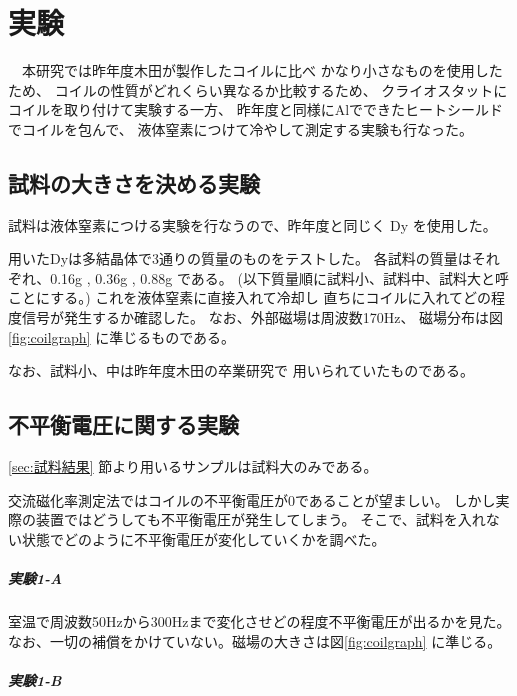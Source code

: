 \chapter{実験}\label{ch:jikken}

　本研究では昨年度木田が製作したコイルに比べ
かなり小さなものを使用したため、
コイルの性質がどれくらい異なるか比較するため、
クライオスタットにコイルを取り付けて実験する一方、
昨年度と同様にAlでできたヒートシールドでコイルを包んで、
液体窒素につけて冷やして測定する実験も行なった。


\section{試料の大きさを決める実験}\label{sec:試料}

試料は液体窒素につける実験を行なうので、昨年度と同じく
Dy を使用した。

用いたDyは多結晶体で3通りの質量のものをテストした。
各試料の質量はそれぞれ、0.16g , 0.36g , 0.88g である。
(以下質量順に試料小、試料中、試料大と呼ことにする。)
これを液体窒素に直接入れて冷却し
直ちにコイルに入れてどの程度信号が発生するか確認した。
なお、外部磁場は周波数170Hz、
磁場分布は図\ref{fig:coilgraph} に準じるものである。

なお、試料小、中は昨年度木田の卒業研究で
用いられていたものである。

\section{不平衡電圧に関する実験}\label{sec:umbalanced V}

\ref{sec:試料結果} 節より用いるサンプルは試料大のみである。

交流磁化率測定法ではコイルの不平衡電圧が0であることが望ましい。
しかし実際の装置ではどうしても不平衡電圧が発生してしまう。
そこで、試料を入れない状態でどのように不平衡電圧が変化していくかを調べた。


\paragraph{実験1-A} 

室温で周波数50Hzから300Hzまで変化させどの程度不平衡電圧が出るかを見た。
なお、一切の補償をかけていない。磁場の大きさは図\ref{fig:coilgraph}
に準じる。

\paragraph{実験1-B}

